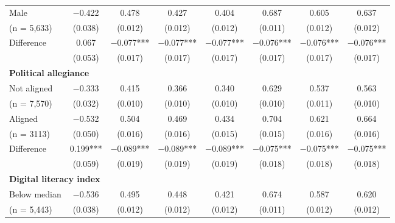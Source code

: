 \begin{table}[H]
{\begin{tabular}{lccccccc}
\hspace{1em} Male & \num{-0.422} & \num{0.478} & \num{0.427} & \num{0.404} & \num{0.687} & \num{0.605} & \num{0.637}\\
\hspace{1.5em}  (n = 5,633)  & (\num{0.038}) & (\num{0.012}) & (\num{0.012}) & (\num{0.012}) & (\num{0.011}) & (\num{0.012}) & (\num{0.012})\\
\cmidrule(lr){2-8}
\hspace{1em} Difference  & \num{0.067} & \num{-0.077}*** & \num{-0.077}*** & \num{-0.077}*** & \num{-0.076}*** & \num{-0.076}*** & \num{-0.076}***\\
 & (\num{0.053}) & (\num{0.017}) & (\num{0.017}) & (\num{0.017}) & (\num{0.017}) & (\num{0.017}) & (\num{0.017})\\
\multicolumn{4}{l}{\textbf{Political allegiance}} \rule{0pt}{1.2\normalbaselineskip}\\
\hspace{1em} Not aligned & \num{-0.333} & \num{0.415} & \num{0.366} & \num{0.340} & \num{0.629} & \num{0.537} & \num{0.563}\\
\hspace{1.5em} (n = 7,570)  & (\num{0.032}) & (\num{0.010}) & (\num{0.010}) & (\num{0.010}) & (\num{0.010}) & (\num{0.011}) & (\num{0.010})\\
\hspace{1em} Aligned & \num{-0.532} & \num{0.504} & \num{0.469} & \num{0.434} & \num{0.704} & \num{0.621} & \num{0.664}\\
\hspace{1.5em} (n = 3113) & (\num{0.050}) & (\num{0.016}) & (\num{0.016}) & (\num{0.015}) & (\num{0.015}) & (\num{0.016}) & (\num{0.016})\\
 \cmidrule(lr){2-8}
\hspace{1em} Difference & \num{0.199}*** & \num{-0.089}*** & \num{-0.089}*** & \num{-0.089}*** & \num{-0.075}*** & \num{-0.075}*** & \num{-0.075}***\\
 & (\num{0.059}) & (\num{0.019}) & (\num{0.019}) & (\num{0.019}) & (\num{0.018}) & (\num{0.018}) & (\num{0.018})\\
\multicolumn{4}{l}{\textbf{Digital literacy index }}  \rule{0pt}{1.2\normalbaselineskip}\\
\hspace{1em} Below median & \num{-0.536} & \num{0.495} & \num{0.448} & \num{0.421} & \num{0.674} & \num{0.587} & \num{0.620}\\
\hspace{1.5em}  (n = 5,443) & (\num{0.038}) & (\num{0.012}) & (\num{0.012}) & (\num{0.012}) & (\num{0.011}) & (\num{0.012}) & (\num{0.012})\\

\end{tabular}}
\end{table}
